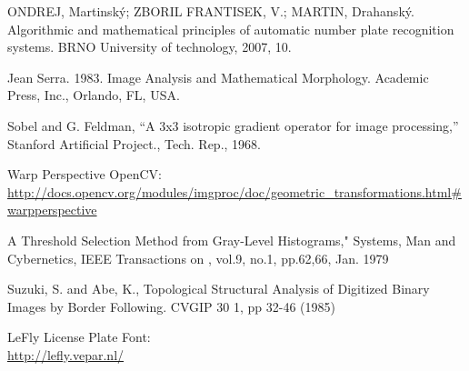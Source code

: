 
\begin{thebibliography}{99}

 ONDREJ, Martinský; ZBORIL FRANTISEK, V.; MARTIN, Drahanský. 
Algorithmic and mathematical principles of automatic number plate recognition systems. 
BRNO University of technology, 2007, 10.

 Jean Serra. 1983. Image Analysis and Mathematical Morphology. Academic Press, Inc., Orlando, FL, USA.

 Sobel and G. Feldman, “A 3x3 isotropic gradient operator for image processing,” Stanford Artificial Project., Tech. Rep., 1968.

 Warp Perspective OpenCV:\\
  \url{http://docs.opencv.org/modules/imgproc/doc/geometric_transformations.html#warpperspective}


 A Threshold Selection Method from Gray-Level Histograms," Systems, Man and Cybernetics, IEEE Transactions on , vol.9, no.1, pp.62,66, Jan. 1979

 Suzuki, S. and Abe, K., Topological Structural Analysis of Digitized Binary Images by Border Following. CVGIP 30 1, pp 32-46 (1985)

 LeFly License Plate Font:\\
  \url{http://lefly.vepar.nl/}

\end{thebibliography}

\vfill

